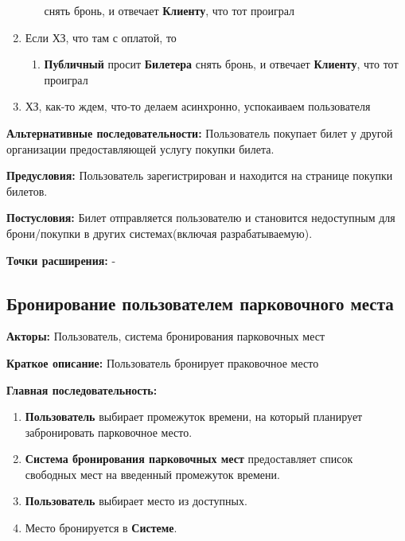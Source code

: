 \begin{enumerate}
\begin{enumerate}
                        снять бронь, и отвечает \textbf{Клиенту},
                        что тот проиграл
            \end{enumerate}
      \item Если ХЗ, что там с оплатой, то
            \begin{enumerate}
                  \item \textbf{Публичный} просит \textbf{Билетера}
                        снять бронь, и отвечает \textbf{Клиенту},
                        что тот проиграл
            \end{enumerate}
      \item ХЗ, как-то ждем, что-то делаем асинхронно,
            успокаиваем пользователя
\end{enumerate}

\textbf{Альтернативные последовательности:} Пользователь покупает билет у другой организации предоставляющей
услугу покупки билета.

\textbf{Предусловия:} Пользователь зарегистрирован и находится на странице покупки билетов.

\textbf{Постусловия:} Билет отправляется пользователю и становится недоступным для брони/покупки в других системах(включая разрабатываемую).

\textbf{Точки расширения:} -




\subsection{Бронирование пользователем парковочного места}

\textbf{Акторы:} Пользователь, система бронирования парковочных мест

\textbf{Краткое описание:} Пользователь бронирует праковочное место

\textbf{Главная последовательность:} 
\begin{enumerate}
      \item \textbf{Пользователь} выбирает промежуток времени, на который планирует забронировать парковочное место. 
      \item \textbf{Система бронирования парковочных мест} предоставляет список свободных мест на введенный промежуток времени.
      \item \textbf{Пользователь} выбирает место из доступных.
      \item Место бронируется в \textbf{Системе}.
\end{enumerate}

